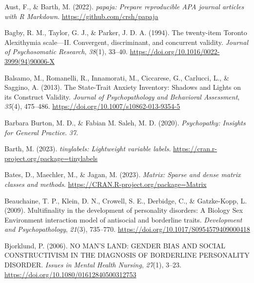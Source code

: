 \documentclass[
  man,floatsintext]{apa7}
\newlength{\cslhangindent}
\newlength{\cslentryspacingunit} %
\newenvironment{CSLReferences}[2] %
 {%
  \setlength{\parindent}{0pt}
  \ifodd #1
  \let\oldpar\par
  \def\par{\hangindent=\cslhangindent\oldpar}
  \fi
  \setlength{\parskip}{#2\cslentryspacingunit}
 }%
 {}
\begin{document}
\hypertarget{refs}{}
\begin{CSLReferences}{1}{0}
\leavevmode{}%
Aust, F., \& Barth, M. (2022). \emph{{papaja}: {Prepare} reproducible {APA} journal articles with {R Markdown}}. \url{https://github.com/crsh/papaja}

\leavevmode{}%
Bagby, R. M., Taylor, G. J., \& Parker, J. D. A. (1994). The twenty-item {Toronto Alexithymia} scale---{II}. {Convergent}, discriminant, and concurrent validity. \emph{Journal of Psychosomatic Research}, \emph{38}(1), 33--40. \url{https://doi.org/10.1016/0022-3999(94)90006-X}

\leavevmode{}%
Balsamo, M., Romanelli, R., Innamorati, M., Ciccarese, G., Carlucci, L., \& Saggino, A. (2013). The {State-Trait Anxiety Inventory}: {Shadows} and {Lights} on its {Construct Validity}. \emph{Journal of Psychopathology and Behavioral Assessment}, \emph{35}(4), 475--486. \url{https://doi.org/10.1007/s10862-013-9354-5}

\leavevmode{}%
Barbara Burton, M. D., \& Fabian M. Saleh, M. D. (2020). \emph{Psychopathy: {Insights} for {General Practice}}. \emph{37}.

\leavevmode{}%
Barth, M. (2023). \emph{{tinylabels}: Lightweight variable labels}. \url{https://cran.r-project.org/package=tinylabels}

\leavevmode{}%
Bates, D., Maechler, M., \& Jagan, M. (2023). \emph{Matrix: Sparse and dense matrix classes and methods}. \url{https://CRAN.R-project.org/package=Matrix}

\leavevmode{}%
Beauchaine, T. P., Klein, D. N., Crowell, S. E., Derbidge, C., \& Gatzke-Kopp, L. (2009). Multifinality in the development of personality disorders: {A Biology} {\texttimes} {Sex} {\texttimes} {Environment} interaction model of antisocial and borderline traits. \emph{Development and Psychopathology}, \emph{21}(3), 735--770. \url{https://doi.org/10.1017/S0954579409000418}

\leavevmode{}%
Bjorklund, P. (2006). {NO MAN}'{S LAND}: {GENDER BIAS AND SOCIAL CONSTRUCTIVISM IN THE DIAGNOSIS OF BORDERLINE PERSONALITY DISORDER}. \emph{Issues in Mental Health Nursing}, \emph{27}(1), 3--23. \url{https://doi.org/10.1080/01612840500312753}


\end{CSLReferences}
\end{document}
